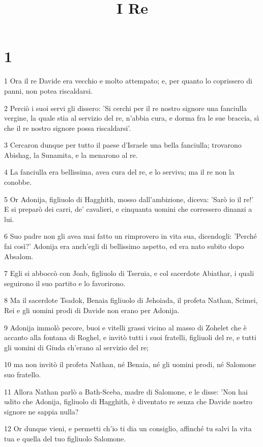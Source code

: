 

\title{I Re}


\chapter{1}

\par 1 Ora il re Davide era vecchio e molto attempato; e, per quanto lo coprissero di panni, non potea riscaldarsi.
\par 2 Perciò i suoi servi gli dissero: 'Si cerchi per il re nostro signore una fanciulla vergine, la quale stia al servizio del re, n'abbia cura, e dorma fra le sue braccia, sì che il re nostro signore possa riscaldarsi'.
\par 3 Cercaron dunque per tutto il paese d'Israele una bella fanciulla; trovarono Abishag, la Sunamita, e la menarono al re.
\par 4 La fanciulla era bellissima, avea cura del re, e lo serviva; ma il re non la conobbe.
\par 5 Or Adonija, figliuolo di Hagghith, mosso dall'ambizione, diceva: 'Sarò io il re!' E si preparò dei carri, de' cavalieri, e cinquanta uomini che corressero dinanzi a lui.
\par 6 Suo padre non gli avea mai fatto un rimprovero in vita sua, dicendogli: 'Perché fai così?' Adonija era anch'egli di bellissimo aspetto, ed era nato subito dopo Absalom.
\par 7 Egli si abboccò con Joab, figliuolo di Tseruia, e col sacerdote Abiathar, i quali seguirono il suo partito e lo favorirono.
\par 8 Ma il sacerdote Tsadok, Benaia figliuolo di Jehoiada, il profeta Nathan, Scimei, Rei e gli uomini prodi di Davide non erano per Adonija.
\par 9 Adonija immolò pecore, buoi e vitelli grassi vicino al masso di Zohelet che è accanto alla fontana di Roghel, e invitò tutti i suoi fratelli, figliuoli del re, e tutti gli uomini di Giuda ch'erano al servizio del re;
\par 10 ma non invitò il profeta Nathan, né Benaia, né gli uomini prodi, né Salomone suo fratello.
\par 11 Allora Nathan parlò a Bath-Sceba, madre di Salomone, e le disse: 'Non hai udito che Adonija, figliuolo di Hagghith, è diventato re senza che Davide nostro signore ne sappia nulla?
\par 12 Or dunque vieni, e permetti ch'io ti dia un consiglio, affinché tu salvi la vita tua e quella del tuo figliuolo Salomone.
